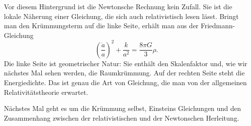 Vor diesem Hintergrund ist die Newtonsche Rechnung kein Zufall. Sie ist die lokale Näherung einer Gleichung, die sich auch relativistisch lesen lässt. Bringt man den Krümmungsterm auf die linke Seite, erhält man aus der Friedmann-Gleichung
\begin{equation}
\left(\frac{\dot a}{a}\right)^2+\frac{k}{a^2}=\frac{8\pi G}{3}\rho.
\end{equation}
Die linke Seite ist geometrischer Natur: Sie enthält den Skalenfaktor und, wie wir nächstes Mal sehen werden, die Raumkrümmung. Auf der rechten Seite steht die Energiedichte. Das ist genau die Art von Gleichung, die man von der allgemeinen Relativitätstheorie erwartet.

Nächstes Mal geht es um die Krümmung selbst, Einsteins Gleichungen und den Zusammenhang zwischen der relativistischen und der Newtonschen Herleitung.
